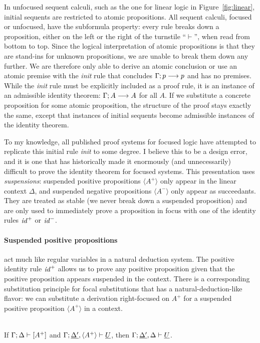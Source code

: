 In unfocused sequent calculi, such as the one for linear logic in
Figure~\ref{fig:linear}, initial sequents are restricted to atomic
propositions. All sequent calculi, focused or unfocused, have the
subformula property: every rule breaks down a proposition, either on
the left or the right of the turnstile ``$\vdash$'', 
when read from bottom to top. 
Since the logical interpretation of atomic
propositions is that they are stand-ins for unknown propositions, we
are unable to break them down any further. We are therefore only able
to derive an atomic conclusion or use an atomic premise with the {\it
  init} rule that concludes ${\Gamma};{p} \longrightarrow {p} \mathstrut$ and has no premises.
While the {\it init} rule must be explicitly included as a proof rule,
it is an instance of an admissible identity theorem:
${\Gamma};{A} \longrightarrow {A} \mathstrut$ for all $A$. If we substitute a concrete
proposition for some atomic proposition, the structure of the proof
stays exactly the same, except that instances of initial sequents
become admissible instances of the identity theorem.

To my knowledge, all published proof systems for focused logic have
attempted to replicate this initial rule {\it init} to some
degree. I believe this to
be a design error, and it is one that has historically made it
enormously (and unnecessarily) difficult to prove the identity theorem
for focused systems. This presentation uses {\it suspensions}:
suspended positive propositions $\langle A^+ \rangle$ only appear in
the linear context $\Delta$, and suspended negative propositions
$\langle A^- \rangle$ only appear as succeedants. They are treated as
stable (we never break down a suspended proposition) and are only used
to immediately prove a proposition in focus with one of the identity
rules ${\it id}^+$ or ${\it id}^-$.

\paragraph{Suspended positive propositions} act much like regular variables in a
natural deduction system. The positive identity rule ${\it id}^+$
allows us to prove any positive proposition given that the positive
proposition appears suspended in the context.  There is a
corresponding substitution principle for focal substitutions that has
a natural-deduction-like flavor: we can substitute a derivation
right-focused on $A^+$ for a suspended positive proposition $\langle
A^+ \rangle$ in a context.

\bigskip
\begin{theorem}\label{thm:fsubst-pos}~\\
If ${\Gamma};{\Delta} \vdash {[A^+]} \mathstrut$ 
and ${\Gamma};{\underline{\Delta'}, \langle A^+ \rangle} \vdash {\underline{U}} \mathstrut$, 
then ${\Gamma};{\underline{\Delta'}, \Delta} \vdash {\underline{U}} \mathstrut$.
\end{theorem}

